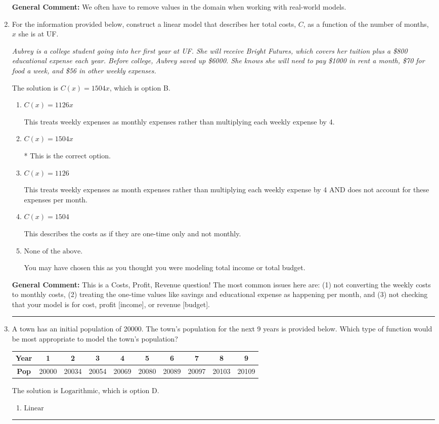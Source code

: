 \documentclass{extbook}[14pt]
\newcommand{\litem}[1]{\item #1

\rule{\textwidth}{0.4pt}}
\begin{document}
\begin{enumerate}
{\textbf{General Comment:} We often have to remove values in the domain when working with real-world models.
}
\litem{
For the information provided below, construct a linear model that describes her total costs, $C$, as a function of the number of months, $x$ she is at UF. 

\begin{center}
    \textit{ Aubrey is a college student going into her first year at UF. She will receive Bright Futures, which covers her tuition plus a \$800 educational expense each year. Before college, Aubrey saved up \$6000. She knows she will need to pay \$1000 in rent a month, \$70 for food a week, and \$56 in other weekly expenses. }
\end{center}
The solution is \( C(x) = 1504 x \), which is option B.\begin{enumerate}[label=\Alph*.]
\item \( C(x) = 1126 x \)

This treats weekly expenses as monthly expenses rather than multiplying each weekly expense by 4.
\item \( C(x) = 1504 x \)

* This is the correct option.
\item \( C(x) = 1126 \)

This treats weekly expenses as month expenses rather than multiplying each weekly expense by 4 AND does not account for these expenses per month.
\item \( C(x) = 1504 \)

This describes the costs as if they are one-time only and not monthly.
\item \( \text{None of the above.} \)

You may have chosen this as you thought you were modeling total income or total budget.
\end{enumerate}

\textbf{General Comment:} This is a Costs, Profit, Revenue question! The most common issues here are: (1) not converting the weekly costs to monthly costs, (2) treating the one-time values like savings and educational expense as happening per month, and (3) not checking that your model is for cost, profit [income], or revenue [budget].
}
\litem{
A town has an initial population of 20000. The town's population for the next 9 years is provided below. Which type of function would be most appropriate to model the town's population?


\begin{tabular}{c|c|c|c|c|c|c|c|c|c}
\textbf{Year} &1 &2 &3 &4 &5 &6 &7 &8 &9\tabularnewline \hline
\textbf{Pop} &20000 &20034 &20054 &20069 &20080 &20089 &20097 &20103 &20109\end{tabular}The solution is \( \text{Logarithmic} \), which is option D.\begin{enumerate}[label=\Alph*.]
\item \( \text{Linear} \)


\end{enumerate}}
\end{enumerate}
\end{document}
